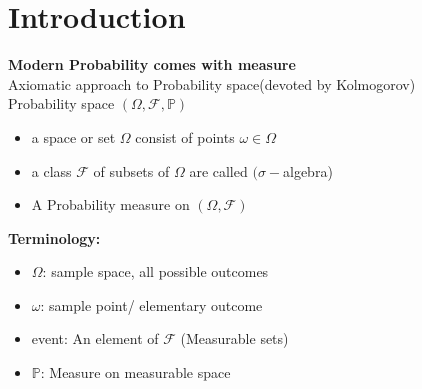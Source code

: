 \newpage
\section{Introduction \label{sec:intro}}
\textbf{Modern Probability comes with measure} \\
Axiomatic approach to Probability space(devoted by Kolmogorov) \\
Probability space $(\Omega, \mathcal{F}, \mathbb{P})$
\begin{itemize}
    \item a space or set $\Omega$ consist of points $\omega \in \Omega$
    \item a class $\mathcal{F}$ of subsets of $\Omega$ are called $(\sigma-$algebra)
    \item A Probability measure on $(\Omega, \mathcal{F})$
\end{itemize}
\textbf{Terminology:}
\begin{itemize}
    \item $\Omega$: sample space, all possible outcomes
    \item $\omega$: sample point/ elementary outcome
    \item event: An element of $\mathcal{F}$ (Measurable sets)
    \item $\mathbb{P}$: Measure on measurable space
\end{itemize}
